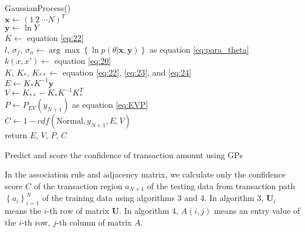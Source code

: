 \documentclass[final,authoryear,5p,times,twocolumn]{elsarticle}
\begin{document}
\begin{algorithm}[h]
GaussianProcess() \\
$\mathbf{x}\leftarrow \left ( 1\: 2\: \cdots N \right )^T$ \\
$\mathbf{y}\leftarrow \ln Y$ \\
$K \leftarrow$ equation \eqref{eq:22} \\
$l,\, \sigma_f,\, \sigma_n \leftarrow \arg\max\left \{ \ln p(\theta|\mathbf{x},\mathbf{y})\right \}$ as equation \eqref{eq:para_theta}\\
$k(x,x')\leftarrow$ equation \eqref{eq:20} \\
$K,\, K_*,\, K_{**} \leftarrow$ equation \eqref{eq:22}, \eqref{eq:23}, and \eqref{eq:24} \\
$E \leftarrow K_*K^{-1}\mathbf{y}$ \\
$V \leftarrow K_{**}-K_*K^{-1}K_*^T$ \\
$P \leftarrow P_{EV}(y_{N+1})$ as equation \eqref{eq:EVP} \\
$C \leftarrow 1-cdf(\text{Normal},y_{N+1}, E,V)$ \\
return $E$, $V$, $P$, $C$
\caption{Predict and score the confidence of transaction amount using GPs}
\end{algorithm}

In the association rule and adjacency matrix, we calculate only the confidence score $C$ of the transaction region $a_{N+1}$ of the testing data from transaction path $\left \{ a_i \right \}_{i=1}^{N}$ of the training data using algorithms 3 and 4. In algorithm 3, $\mathbf{U}_i$ means the $i$-th row of matrix $\mathbf{U}$. In algorithm 4, $A(i,j)$ means an entry value of the $i$-th row, $j$-th column of matrix $A$.
\end{document}
